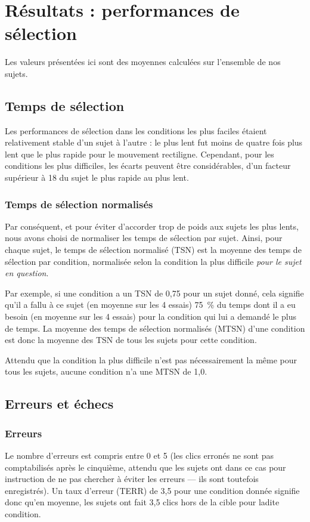 \section{Résultats : performances de sélection}
	Les valeurs présentées ici sont des moyennes calculées sur l'ensemble de nos sujets.
	
	\subsection{Temps de sélection}
	Les performances de sélection dans les conditions les plus faciles étaient relativement stable d'un sujet à l'autre : le plus lent fut moins de quatre fois plus lent que le plus rapide pour le mouvement rectiligne. Cependant, pour les conditions les plus difficiles, les écarts peuvent être considérables, d'un facteur supérieur à 18 du sujet le plus rapide au plus lent.
	
	\subsubsection{Temps de sélection normalisés}
	Par conséquent, et pour éviter d'accorder trop de poids aux sujets les plus lents, nous avons choisi de normaliser les temps de sélection par sujet. Ainsi, pour chaque sujet, le temps de sélection normalisé (TSN) est la moyenne des temps de sélection par condition, normalisée selon la condition la plus difficile \emph{pour le sujet en question}.
	
	Par exemple, si une condition a un TSN de 0,75 pour un sujet donné, cela signifie qu'il a fallu à ce sujet (en moyenne sur les 4 essais) 75~\%{} du temps dont il a eu besoin (en moyenne sur les 4 essais) pour la condition qui lui a demandé le plus de temps. La moyenne des temps de sélection normalisés (MTSN) d'une condition est donc la moyenne des TSN de tous les sujets pour cette condition.
	
	Attendu que la condition la plus difficile n'est pas nécessairement la même pour tous les sujets, aucune condition n'a une MTSN de 1,0.
	
	\subsection{Erreurs et échecs}
	\subsubsection{Erreurs}
	Le nombre d'erreurs est compris entre 0 et 5 (les clics erronés ne sont pas comptabilisés après le cinquième, attendu que les sujets ont dans ce cas pour instruction de ne pas chercher à éviter les erreurs --- ils sont toutefois enregistrés). Un taux d'erreur (TERR) de 3,5 pour une condition donnée signifie donc qu'en moyenne, les sujets ont fait 3,5 clics hors de la cible pour ladite condition.
	
